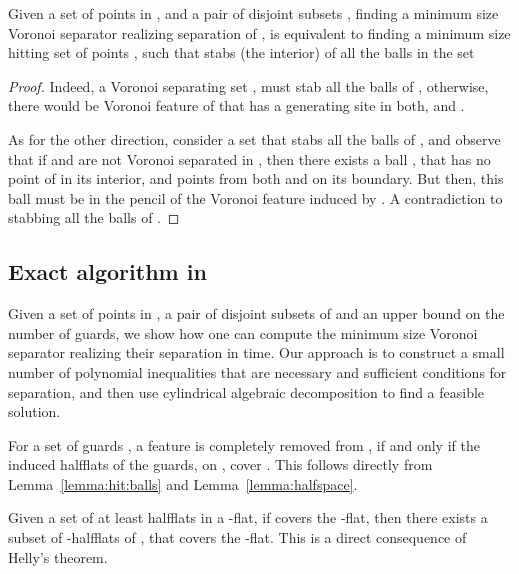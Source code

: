 \InSubmitVer{\documentclass[11pt]{article}}
\numberwithin{figure}{section}
\numberwithin{table}{section}
\numberwithin{equation}{section}
\newcommand{\lemlab}[1]{\label{lemma:#1}}
\newcommand{\lemref}[1]{Lemma~\ref{lemma:#1}}
\newcommand{\obslab}[1]{\label{observation:#1}}
\newcommand{\seclab}[1]{\label{section:#1}}
\begin{document}
\begin{lemma}\lemlab{hit:balls}Given a set  of  points in , and a pair of
    disjoint subsets , finding a minimum
    size Voronoi separator realizing separation of
    , is equivalent to finding a minimum
    size hitting set of points , such that  stabs
    (the interior) of all the balls in the set
    
\end{lemma}
\begin{proof}
    Indeed, a Voronoi separating set , must stab all the
    balls of , otherwise, there would be Voronoi feature
    of  that has a generating site in
    both,  and .
    
    As for the other direction, consider a set  that stabs all
    the balls of , and observe that if  and
     are not Voronoi separated in , then there exists a ball , that has no point
    of  in its interior, and points from both
     and  on its boundary. But then, this ball
    must be in the pencil of the Voronoi feature induced by . A contradiction to  stabbing all the balls of
    .
\end{proof}












\subsection{Exact algorithm in }
\seclab{exact}

Given a set  of  points in , a pair of disjoint
subsets  of  and an upper bound
 on the number of guards, we show how one can compute the
minimum size Voronoi separator realizing their separation in
 time. Our approach is to construct a small number
of polynomial inequalities that are necessary and sufficient
conditions for separation, and then use cylindrical algebraic
decomposition to find a feasible solution.

\begin{observation}
    \obslab{feature:cover} For a set of guards , a feature
     is completely removed from ,
    if and only if the induced halfflats of the guards, on
    , cover . This follows directly from
    \lemref{hit:balls} and \lemref{halfspace}.
\end{observation}


\begin{observation}
    \obslab{helly}Given a set  of at least  halfflats in a -flat, if
     covers the -flat, then there exists a subset of
    -halfflats of , that covers the -flat.  This is a
    direct consequence of Helly's theorem.
\end{observation}
\end{document}
